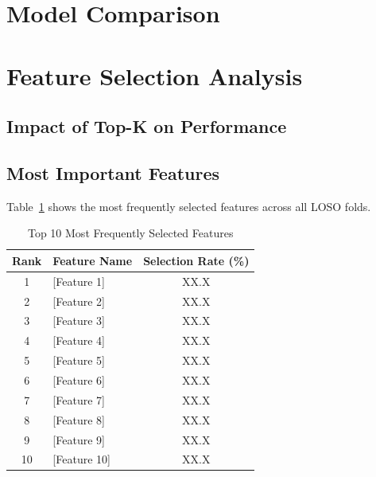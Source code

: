 \section{Model Comparison}
\label{sec:model_comparison}


\section{Feature Selection Analysis}
\label{sec:feature_analysis}

\subsection{Impact of Top-K on Performance}
\label{subsec:topk_impact}


\subsection{Most Important Features}
\label{subsec:important_features}


Table~\ref{tab:top_features} shows the most frequently selected features across all LOSO folds.

\begin{table}[htbp]
    \centering
    \caption{Top 10 Most Frequently Selected Features}
    \label{tab:top_features}
    \begin{tabular}{clc}
        \toprule
        \textbf{Rank} & \textbf{Feature Name} & \textbf{Selection Rate (\%)} \\
        \midrule
        1 & [Feature 1] & XX.X \\
        2 & [Feature 2] & XX.X \\
        3 & [Feature 3] & XX.X \\
        4 & [Feature 4] & XX.X \\
        5 & [Feature 5] & XX.X \\
        6 & [Feature 6] & XX.X \\
        7 & [Feature 7] & XX.X \\
        8 & [Feature 8] & XX.X \\
        9 & [Feature 9] & XX.X \\
        10 & [Feature 10] & XX.X \\
        \bottomrule
    \end{tabular}
\end{table}

